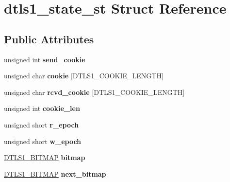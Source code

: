 \hypertarget{structdtls1__state__st}{}\section{dtls1\+\_\+state\+\_\+st Struct Reference}
\label{structdtls1__state__st}
\subsection*{Public Attributes}
\begin{DoxyCompactItemize}
\item 
\mbox{\label{structdtls1__state__st_af87b8915e3c04aa1e8c858e15a967b2d}} 
unsigned int {\bfseries send\+\_\+cookie}
\item 
\mbox{\label{structdtls1__state__st_a3600731c890da666b152e0bea4b17644}} 
unsigned char {\bfseries cookie} \mbox{[}D\+T\+L\+S1\+\_\+\+C\+O\+O\+K\+I\+E\+\_\+\+L\+E\+N\+G\+TH\mbox{]}
\item 
\mbox{\label{structdtls1__state__st_a1a9425f1e37d872f3cc13026092b4ac6}} 
unsigned char {\bfseries rcvd\+\_\+cookie} \mbox{[}D\+T\+L\+S1\+\_\+\+C\+O\+O\+K\+I\+E\+\_\+\+L\+E\+N\+G\+TH\mbox{]}
\item 
\mbox{\label{structdtls1__state__st_aa91963cca02aa5c981c3c1d5c3c6e472}} 
unsigned int {\bfseries cookie\+\_\+len}
\item 
\mbox{\label{structdtls1__state__st_aa3c8e7915e684e4d99aef7e102c57479}} 
unsigned short {\bfseries r\+\_\+epoch}
\item 
\mbox{\label{structdtls1__state__st_ac2348d97c73af669675caa7791fc7320}} 
unsigned short {\bfseries w\+\_\+epoch}
\item 
\mbox{\label{structdtls1__state__st_a3e9ffaed4676ae794845eed4755ef8ce}} 
\hyperlink{structdtls1__bitmap__st}{D\+T\+L\+S1\+\_\+\+B\+I\+T\+M\+AP} {\bfseries bitmap}
\item 
\mbox{\label{structdtls1__state__st_a2ef30a3f09e71c8d936db1f4a8a68c10}} 
\hyperlink{structdtls1__bitmap__st}{D\+T\+L\+S1\+\_\+\+B\+I\+T\+M\+AP} {\bfseries next\+\_\+bitmap}

\end{DoxyCompactItemize}
